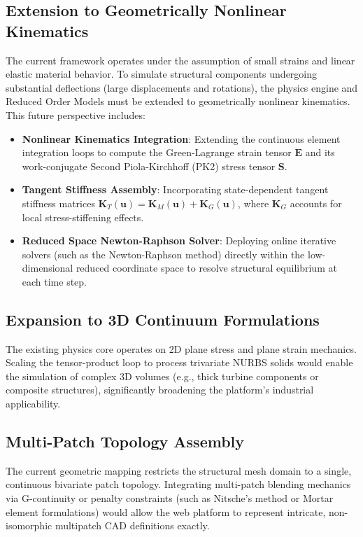 \subsection{Extension to Geometrically Nonlinear Kinematics}
The current framework operates under the assumption of small strains and linear elastic material behavior. To simulate structural components undergoing substantial deflections (large displacements and rotations), the physics engine and Reduced Order Models must be extended to geometrically nonlinear kinematics. This future perspective includes:
\begin{itemize}
    \item \textbf{Nonlinear Kinematics Integration}: Extending the continuous element integration loops to compute the Green-Lagrange strain tensor $\mathbf{E}$ and its work-conjugate Second Piola-Kirchhoff (PK2) stress tensor $\mathbf{S}$.
    \item \textbf{Tangent Stiffness Assembly}: Incorporating state-dependent tangent stiffness matrices $\mathbf{K}_T(\mathbf{u}) = \mathbf{K}_M(\mathbf{u}) + \mathbf{K}_G(\mathbf{u})$, where $\mathbf{K}_G$ accounts for local stress-stiffening effects.
    \item \textbf{Reduced Space Newton-Raphson Solver}: Deploying online iterative solvers (such as the Newton-Raphson method) directly within the low-dimensional reduced coordinate space to resolve structural equilibrium at each time step.
\end{itemize}

\subsection{Expansion to 3D Continuum Formulations}
The existing physics core operates on 2D plane stress and plane strain mechanics. Scaling the tensor-product loop to process trivariate NURBS solids would enable the simulation of complex 3D volumes (e.g., thick turbine components or composite structures), significantly broadening the platform's industrial applicability.

\subsection{Multi-Patch Topology Assembly}
The current geometric mapping restricts the structural mesh domain to a single, continuous bivariate patch topology. Integrating multi-patch blending mechanics via G-continuity or penalty constraints (such as Nitsche's method or Mortar element formulations) would allow the web platform to represent intricate, non-isomorphic multipatch CAD definitions exactly.

